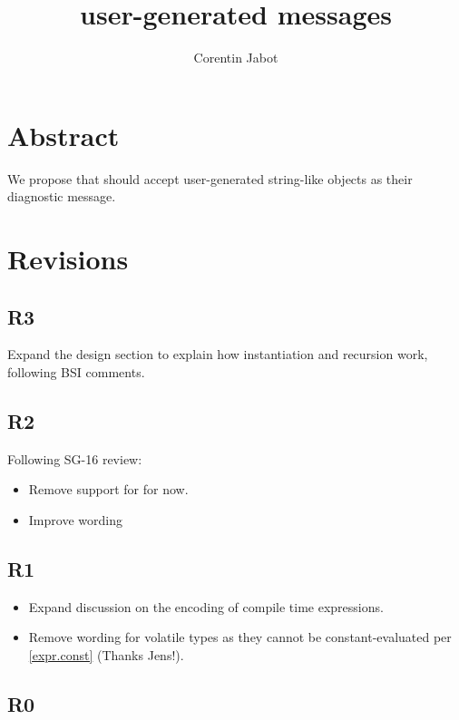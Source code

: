 \documentclass{wg21}
\title{user-generated \tcode{static\_assert} messages}
\author{Corentin Jabot}{corentin.jabot@gmail.com}
\begin{document}
\maketitle

\section{Abstract}

We propose that  should accept user-generated string-like objects as their diagnostic message.

\section{Revisions}

\subsection{R3}

Expand the design section to explain how instantiation and recursion work, following BSI comments.

\subsection{R2}

Following SG-16 review:

\begin{itemize}
\item Remove support for  for now.
\item Improve wording
\end{itemize}

\subsection{R1}

\begin{itemize}
 \item Expand discussion on the encoding of compile time expressions.
 \item Remove wording for volatile types as they cannot be constant-evaluated per \href{https://eel.is/c++draft/expr.const#5.9}{[expr.const]} (Thanks Jens!).
\end{itemize}


\subsection{R0}
\end{document}
